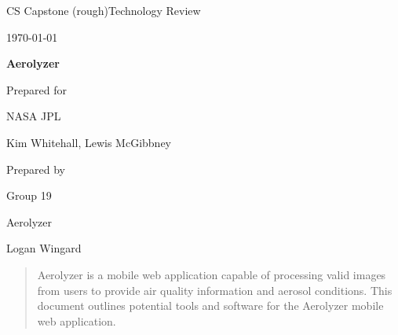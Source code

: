 \documentclass[onecolumn, draftclsnofoot,10pt, compsoc]{IEEEtran}
\def \CapstoneTeamName{		Aerolyzer}
\def \CapstoneTeamNumber{		19}
\def \GroupMemberOne{			Logan Wingard}
\def \GroupMemberTwo{			Kin-Ho Lam}
\def \GroupMemberThree{			Daniel Ross}
\def \CapstoneProjectName{		Aerolyzer}
\def \CapstoneSponsorCompany{	NASA JPL}
\def \CapstoneSponsorPerson{		Kim Whitehall, Lewis McGibbney}
\def \DocType{		%
				(rough)Technology Review
				}
\newcommand{\NameSigPair}[1]{\par
\makebox[2.75in][r]{#1} \hfil 	\makebox[3.25in]{\makebox[2.25in]{\hrulefill} \hfill		\makebox[.75in]{\hrulefill}}
\par\vspace{-12pt} \textit{\tiny\noindent
\makebox[2.75in]{} \hfil		\makebox[3.25in]{\makebox[2.25in][r]{Signature} \hfill	\makebox[.75in][r]{Date}}}}
\renewcommand{\NameSigPair}[1]{#1}
\begin{document}
\begin{titlepage}
    \begin{singlespace}
        \hfill 
        \par\vspace{.2in}
        \centering
        \scshape{
            \huge CS Capstone \DocType \par
            {\large\today}\par
            \vspace{.5in}
            \textbf{\Huge\CapstoneProjectName}\par
            \vfill
            {\large Prepared for}\par
            \Huge \CapstoneSponsorCompany\par
            \vspace{5pt}
            {\Large\NameSigPair{\CapstoneSponsorPerson}\par}
            {\large Prepared by }\par
            Group\CapstoneTeamNumber\par
            \CapstoneTeamName\par 
            \vspace{5pt}
            {\Large
                \NameSigPair{\GroupMemberOne}\par
            }
            \vspace{20pt}
        }
        \begin{abstract}
        	Aerolyzer is a mobile web application capable of processing valid images from users to provide air quality information and aerosol conditions. 
            This document outlines potential tools and software for the Aerolyzer mobile web application.
        \end{abstract}     
    \end{singlespace}
\end{titlepage}
\newpage
{}
\tableofcontents
\clearpage
\end{document}
